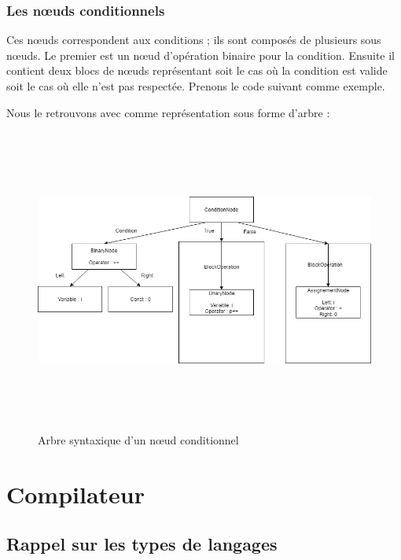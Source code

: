 \documentclass[12pt, twoside, openright]{report}
\begin{document}
\subsubsection{Les n\oe{}uds conditionnels}
Ces n\oe{}uds correspondent aux conditions ; ils sont composés de plusieurs sous n\oe{}uds. Le premier est un n\oe{}ud d'opération binaire pour la condition. Ensuite il contient deux blocs de n\oe{}uds représentant soit le cas où la condition est valide soit le cas où elle n'est pas respectée. Prenons le code suivant comme exemple.
    
    Nous le retrouvons avec comme représentation sous forme d'arbre :
    \begin{figure}[H]
        \begin{center}
            \includegraphics[height=10cm,width=14cm]{Ast/ASTIfNode.png}
            \caption{Arbre syntaxique d'un n\oe{}ud conditionnel}
        \end{center}
    \end{figure}

\section{Compilateur}

\subsection{Rappel sur les types de langages}
\end{document}
